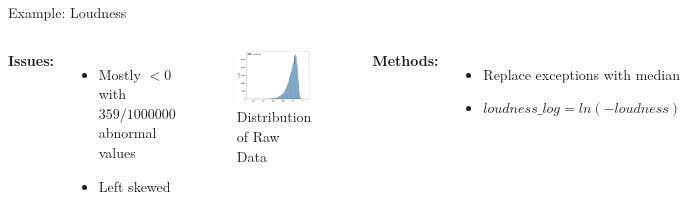\documentclass{beamer}
\begin{document}
\begin{frame}{Example: Loudness}

\begin{columns}
    \textbf{Issues:}
    \begin{itemize}
        \item Mostly $<0$ with $359/1000000$ abnormal values 
        \item Left skewed
    \end{itemize}
    \medskip
    \begin{figure}
		\centering
		\includegraphics[width=5cm]{img/Loudness_before.png}
		\caption{Distribution of Raw Data}
    \end{figure}



    \textbf{Methods: }
    \begin{itemize}
        \item Replace exceptions with median 
        \item $loudness\_log = ln(- loudness)$
    \end{itemize}
    
	\begin{figure}
		\centering
		\includegraphics[width=5cm]{img/Loudness_after.png}
		\caption{Distribution of Adjusted Data}
	\end{figure}
\end{columns}










\end{frame}
\end{document}

